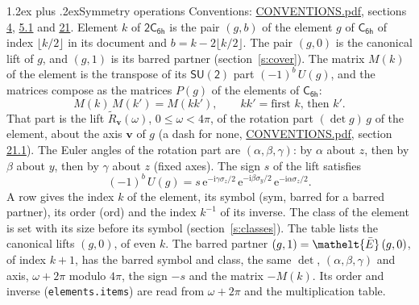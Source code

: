 \documentclass[10pt,a4paper]{article}
\makeatletter
\renewcommand\section{\@startsection{section}{1}{\z@}{-3ex plus -1ex minus -.2ex}%
  {1.2ex plus .2ex}{\normalfont\large\sffamily\bfseries\color{parttitle}}}
\numberwithin{equation}{section}
\newcommand{\eltfont}[1]{{\let\sigma\eltsigma\mathelt{#1}}}
\newcommand{\grp}[1]{\mathsf{#1}}
\newcommand{\elt}[1]{\eltfont{#1}}
\newcommand{\vv}{\mathbf{v}}
\newcommand{\iunit}{\mathrm{i}}
\newcommand{\expe}{\mathrm{e}}
\newcommand{\barred}[1]{\bar{#1}}
\newcommand{\lift}[1]{\tilde{#1}}
\newcommand{\pauli}[1]{\sigma_{#1}}
\makeatother
\begin{document}
\section{Symmetry operations}\label{s:elements}
Conventions: \href{../../CONVENTIONS.pdf}{CONVENTIONS.pdf}, sections \href{../../../rotation/CONVENTIONS.pdf\#conv.4}{4}, \href{../../../rotation/CONVENTIONS.pdf\#conv.5.1}{5.1} and \href{../../CONVENTIONS.pdf\#conv.21}{21}.
\leavevmode\label{n:index.element}\label{n:element.g}Element $k$ of $\grp{2C_{6h}}$ is the pair $(g, b)$ of the element $g$ of \href{../../../rotation/data/pdf/C6h.pdf}{$\grp{C_{6h}}$} of index $\lfloor k/2\rfloor$ in its document and $b = k - 2\lfloor k/2\rfloor$. The pair $(g, 0)$ is the canonical lift of $g$, and $(g, 1)$ is its barred partner (section~\ref{s:cover}). \label{n:matrix.element.pin}\label{n:matrix.element}The matrix $M(k)$ of the element is the transpose of its $\grp{SU(2)}$ part $(-1)^{b}\,U(g)$, and the matrices compose as the matrices $P(g)$ of the elements of $\grp{C_{6h}}$:
\begin{equation}\label{e:mprod}M(k)\,M(k') = M(kk'),\qquad kk' = \text{first } k\text{, then } k'.\end{equation}
\leavevmode\label{n:angle.omega}\label{n:vector.axis}\label{n:vector.pole}That part is the lift $\lift{R}_{\vv}(\omega)$, $0 \le \omega < 4\pi$, of the rotation part $(\det g)\,g$ of the element, about the axis $\vv$ of $g$ (a dash for none, \href{../../CONVENTIONS.pdf}{CONVENTIONS.pdf}, section \href{../../CONVENTIONS.pdf\#conv.21.1}{21.1}). \label{n:angle.euler.alpha}\label{n:angle.euler.beta}\label{n:angle.euler.gamma}\label{n:vector.coordinates}The Euler angles of the rotation part are $(\alpha,\beta,\gamma)$: by $\alpha$ about $z$, then by $\beta$ about $y$, then by $\gamma$ about $z$ (fixed axes). \label{n:local.euler.sign}The sign $s$ of the lift satisfies
\begin{equation}\label{e:euler}(-1)^{b}\,U(g) = s\,\expe^{-\iunit\gamma\pauli{z}/2}\,\expe^{-\iunit\beta\pauli{y}/2}\,\expe^{-\iunit\alpha\pauli{z}/2}.\end{equation}
\leavevmode\label{n:index.element.inverse}\label{n:head.sym}\label{n:head.ord}A row gives the index $k$ of the element, its symbol (sym, barred for a barred partner), its order (ord) and the index $k^{-1}$ of its inverse. \label{n:head.class}The class of the element is set with its size before its symbol (section~\ref{s:classes}).
The table lists the canonical lifts $(g, 0)$, of even $k$. The barred partner $(g, 1) = \elt{\barred{E}}\,(g, 0)$, of index $k + 1$, has the barred symbol and class, the same $\det$, $(\alpha,\beta,\gamma)$ and axis, $\omega + 2\pi$ modulo $4\pi$, the sign $-s$ and the matrix $-M(k)$. Its order and inverse (\texttt{elements.items}) are read from $\omega + 2\pi$ and the multiplication table.
\end{document}
